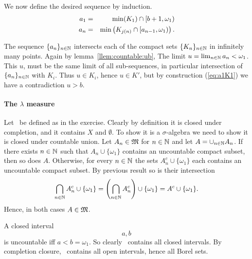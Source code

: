\begin{enumerate}
We now define the desired sequence by induction.
\begin{eqnarray}
a_1 &=& \min(K_1) \cap [b+1,\omega_1)  \label{eq:a1K1} \\
a_n &=& \min\left(K_{j(n)} \cap [a_{n-1},\omega_1)\right). \notag
\end{eqnarray}

The sequence \(\{a_n\}_{n\in\mathbb{N}}\) intersects each of the
compact sets \(\{K_n\}_{n\in\mathbb{N}}\) in infinitely many points.
Again by lemma~\ref{llem:countable:ub},
The limit \(u = \lim_{n\in\mathbb{N}} a_n < \omega_1\).
This $u$, must be the same limit of all sub-sequences, in particular
intersection of \(\{a_n\}_{n\in\mathbb{N}}\) with \(K_i\). Thus \(u\in K_i\),
hence \(u\in K'\), but by construction (\ref{eq:a1K1})
we have a contradiction \(u>b\).

\paragraph{The \(\lambda\) measure}
Let \frakM\ be defined as in the exercise. Clearly by definition
it is closed under completion, and it contains $X$ and \(\emptyset\).
To show it is a \(\sigma\)-algebra we need to show it is closed
under countable union. Let \(A_n\in\mathfrak{M}\) for \(n\in\mathbb{N}\) and
let \(A=\cup_{n\in\mathbb{N}}A_n\). If there exists \(n\in\mathbb{N}\) such that
\(A_n\cup\{\omega_1\}\) contains an uncountable compact subset,
then so does $A$.  Otherwise, for every \(n\in\mathbb{N}\) the sets
\(A_n^c\cup\{\omega_1\}\) each contains an uncountable compact subset.
By previous result so is their intersection
\begin{equation*}
 \bigcap_{n\in\mathbb{N}} A_n^c\cup\{\omega_1\} =
 \left(\bigcap_{n\in\mathbb{N}} A_n^c\right)\cup\{\omega_1\} =
 A^c\cup\{\omega_1\}.
\end{equation*}
Hence, in both cases \(A\in\mathfrak{M}\).

A closed interval \[a,b\] is uncountable iff \(a<b=\omega_1\). So clearly
\frakM\ contains all closed intervals. By completion closure, \frakM\ contains
all open intervals, hence all Borel sets.


\end{enumerate}
